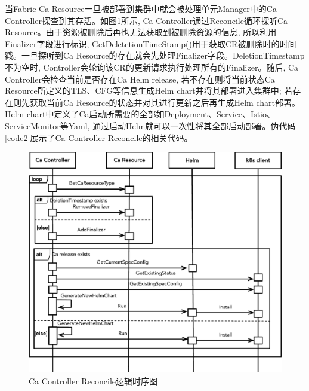 当Fabric Ca Resource一旦被部署到集群中就会被处理单元Manager中的Ca  Controller探查到其存活。如图\ref{reconcile}所示, Ca Controller通过Reconcile循环探听Ca Resource。由于资源被删除后再也无法获取到被删除资源的信息, 所以利用Finalizer字段进行标识, GetDeletetionTimeStamp()用于获取CR被删除时的时间戳。一旦探听到Ca Resource的存在就会先处理Finalizer字段。DeletionTimestamp不为空时, Controller会轮询该CR的更新请求执行处理所有的Finalizer。随后, Ca Controller会检查当前是否存在Ca Helm release, 若不存在则将当前状态Ca Resource所定义的TLS、CFG等信息生成Helm chart并将其部署进入集群中; 若存在则先获取当前Ca Resource的状态并对其进行更新之后再生成Helm chart部署。Helm chart中定义了Ca启动所需要的全部如Deployment、Service、Istio、ServiceMonitor等Yaml, 通过启动Helm就可以一次性将其全部启动部署。伪代码\ref{code2}展示了Ca Controller Reconcile的相关代码。

\begin{figure}[!htbp] %
    \centering %
    \includegraphics[width=1.0\textwidth]{FIGs/chapter5/reconcile.pdf} %
    \caption{Ca Controller Reconcile逻辑时序图} %
    \label{reconcile} %
\end{figure}%

